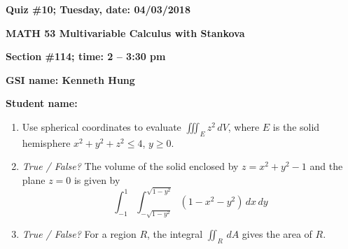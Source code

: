 \documentclass{article}
\begin{document}
{\bf Quiz \#10; Tuesday, date: 04/03/2018}

{\bf MATH 53 Multivariable Calculus with Stankova}

{\bf Section \#114; time: 2 -- 3:30 pm}

{\bf GSI name: Kenneth Hung}

{\bf Student name:}

\vspace*{0.25in}

\begin{enumerate}
\item Use spherical coordinates to evaluate $\iiint_E z^2 \,dV$, where $E$ is the solid hemisphere $x^2 + y^2 + z^2 \le 4$, $y \ge 0$.

\item {\em True / False?} The volume of the solid enclosed by $z = x^2 + y^2 - 1$ and the plane $z = 0$ is given by
\[
\int_{-1}^1 \int_{-\sqrt{1 - y^2}}^{\sqrt{1 - y^2}} (1 - x^2 - y^2) \,dx \,dy
\]

\item {\em True / False?} For a region $R$, the integral $\iint_R \,dA$ gives the area of $R$.
\end{enumerate}
\end{document}
